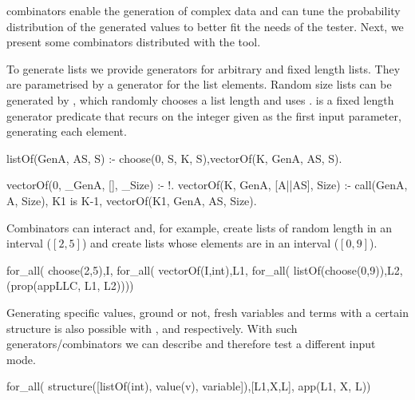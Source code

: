 \plqc{} combinators enable the generation of complex data and can tune
the probability distribution of the generated values to better fit the
needs of the tester.
%
Next, we present some combinators distributed with the tool.



%
To generate lists we provide generators for arbitrary and
fixed length lists.
%
They are parametrised by a generator for the list elements.
%
Random size lists can be generated by , which randomly
chooses a list length and uses . 
%
 is a fixed length generator predicate that recurs on
the integer given as the first input parameter, generating each element.
\begin{yapcode}
 listOf(GenA, AS, S) :- choose(0, S, K, S),vectorOf(K, GenA, AS, S).

 vectorOf(0, _GenA, [], _Size) :- !.
 vectorOf(K, GenA, [A||AS], Size) :-
   call(GenA, A, Size), K1 is K-1, vectorOf(K1, GenA, AS, Size).
\end{yapcode}
%
Combinators can interact and, for example, create lists of random length
in an interval ($[2,5]$) and create lists whose elements are in an
interval ($[0,9]$).
%
\begin{yapcode}
   for_all( choose(2,5),I, for_all( vectorOf(I,int),L1,
     for_all( listOf(choose(0,9)),L2, (prop({appLLC, L1, L2}))))
\end{yapcode}


Generating specific values, ground or not, fresh variables and terms
with a certain structure is also possible with ,
 and  respectively.
%
With such generators/combinators we can describe and therefore test a
different input mode.
\begin{yapcode}
   for_all( structure([listOf(int), value(v), variable]),[L1,X,L],
     app(L1, X, L))
\end{yapcode}





